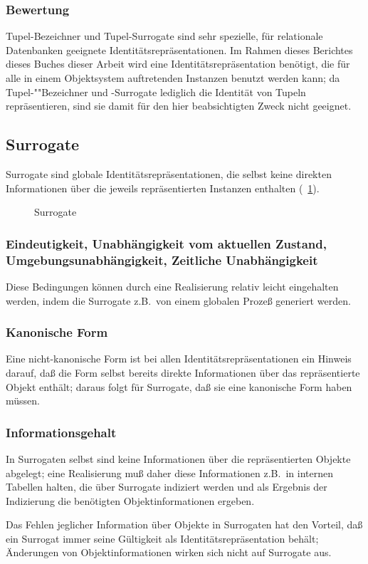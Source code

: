 \subsubsection{Bewertung}
%
Tupel-Bezeichner und Tupel-Surrogate sind sehr spezielle, f\"{u}r
relationale Datenbanken geeignete Identit\"{a}tsrepr\"{a}sentationen.
Im Rahmen \ifbericht dieses Berichtes \else\ifbuch dieses Buches \else
dieser Arbeit \fi\fi wird eine Identit\"{a}tsrepr\"{a}sentation
be\-n\"{o}\-tigt, die f\"{u}r alle in einem Objektsystem auftretenden
Instanzen benutzt werden kann; da Tu\-pel-""Be\-zeich\-ner und
-Surrogate lediglich die Identit\"{a}t von Tupeln repr\"{a}sentieren,
sind sie damit f\"{u}r den hier beabsichtigten Zweck nicht geeignet.
%
\subsection{Surrogate}%
\label{sec:idsur}%
%
Surrogate sind globale Identit\"{a}tsrepr\"{a}sentationen, die
selbst keine direkten Informationen \"{u}ber die jeweils repr\"{a}sentierten
Instanzen enthalten (\figurename~\ref{fig:suridnty}).
%
\begin{figure}[htbp]%
\ifbuch%
\centerline{}%
\else%
\centerline{}%
\fi%
\caption{Surrogate}\label{fig:suridnty}%
\end{figure}%
%
\subsubsection{Eindeutigkeit, Unabh\"{a}ngigkeit vom aktuellen Zustand,
Umgebungsunabh\"{a}ngigkeit, Zeitliche Unabh\"{a}ngigkeit}
%
Diese Bedingungen k\"{o}nnen durch eine Realisierung relativ leicht
eingehalten werden, indem die Surrogate z.B.\ von einem globalen
Proze\ss{} generiert werden.
%
\subsubsection{Kanonische Form}
%
Eine nicht-kanonische Form ist bei allen Identit\"{a}tsrepr\"{a}sentationen
ein Hinweis darauf, da\ss{} die Form selbst bereits direkte Informationen
\"{u}ber das repr\"{a}sentierte Objekt enth\"{a}lt; daraus folgt f\"{u}r
Surrogate, da\ss{} sie eine kanonische Form haben m\"{u}ssen.
%
\subsubsection{Informationsgehalt} 
%
In Surrogaten selbst sind keine Informationen \"{u}ber die
repr\"{a}sentierten Objekte abgelegt; eine Realisierung mu\ss{} daher diese
Informationen z.B.\ in internen Tabellen halten, die \"{u}ber Surrogate
indiziert werden und als Ergebnis der Indizierung die ben\"{o}tigten
Objektinformationen ergeben.
%
\par{}Das Fehlen jeglicher Information \"{u}ber Objekte in Surrogaten hat
den Vorteil, da\ss{} ein Surrogat immer seine G\"{u}ltigkeit als
Identit\"{a}tsrepr\"{a}sentation beh\"{a}lt; \"{A}nderungen von
Objektinformationen wirken sich nicht auf Surrogate aus.
%
